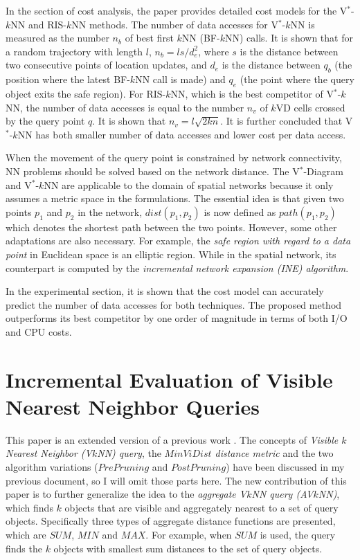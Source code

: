 \documentclass[paper=a4, fontsize=18pt]{article} %
\numberwithin{equation}{section} %
\numberwithin{figure}{section} %
\numberwithin{table}{section} %
\begin{document}
In the section of cost analysis, the paper provides detailed cost models for the V$^*$-$k$NN and RIS-$k$NN methods. The number of data accesses for V$^*$-$k$NN is measured as the number $n_b$ of best first $k$NN (BF-$k$NN) calls. It is shown that for a random trajectory with length $l$, $n_b = ls /d_e^2$, where $s$ is the distance between two consecutive points of location updates, and $d_e$ is the distance between $q_b$ (the position where the latest BF-$k$NN call is made) and $q_e$ (the point where the query object exits the safe region). For RIS-$k$NN, which is the best competitor of V$^*$-$k$NN, the number of data accesses is equal to the number $n_v$ of $k$VD cells crossed by the query point $q$. It is shown that $n_v = l \sqrt{2kn}$. It is further concluded that V$^*$-$k$NN has both smaller number of data accesses and lower cost per data access.

When the movement of the query point is constrained by network connectivity, NN problems should be solved based on the network distance. The V$^*$-Diagram and V$^*$-$k$NN are applicable to the domain of spatial networks because it only assumes a metric space in the formulations. The essential idea is that given two points $p_1$ and $p_2$ in the network, $dist(p_1,p_2)$ is now defined as $path(p_1,p_2)$ which denotes the shortest path between the two points. However, some other adaptations are also necessary. For example, the \emph{safe region with regard to a data point} in Euclidean space is an elliptic region. While in the spatial network, its counterpart is computed by the \emph{incremental network expansion (INE) algorithm}.

In the experimental section, it is shown that the cost model can accurately predict the number of data accesses for both techniques. The proposed method outperforms its best competitor by one order of magnitude in terms of both I/O and CPU costs.

\section{Incremental Evaluation of Visible Nearest Neighbor Queries \cite{NTZ10}}

This paper is an extended version of a previous work \cite{NTZ07}. The concepts of \emph{Visible $k$ Nearest Neighbor (V$k$NN) query}, the \emph{$MinViDist$ distance metric} and the two algorithm variations ($PrePruning$ and $PostPruning$) have been discussed in my previous document, so I will omit those parts here. The new contribution of this paper is to further generalize the idea to the \emph{aggregate V$k$NN query (AV$k$NN)}, which finds $k$ objects that are visible and aggregately nearest to a set of query objects. Specifically three types of aggregate distance functions are presented, which are $SUM$, $MIN$ and $MAX$. For example, when $SUM$ is used, the query finds the $k$ objects with smallest sum distances to the set of query objects.
\end{document}

